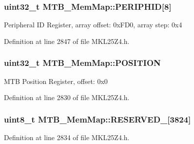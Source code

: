 \subsubsection[{\texorpdfstring{P\+E\+R\+I\+P\+H\+ID}{PERIPHID}}]{\setlength{\rightskip}{0pt plus 5cm}uint32\+\_\+t M\+T\+B\+\_\+\+Mem\+Map\+::\+P\+E\+R\+I\+P\+H\+ID\mbox{[}8\mbox{]}}\hypertarget{struct_m_t_b___mem_map_a1e121406a44ce4c5261292e960a86e29}{}\label{struct_m_t_b___mem_map_a1e121406a44ce4c5261292e960a86e29}
Peripheral ID Register, array offset\+: 0x\+F\+D0, array step\+: 0x4 

Definition at line 2847 of file M\+K\+L25\+Z4.\+h.

\subsubsection[{\texorpdfstring{P\+O\+S\+I\+T\+I\+ON}{POSITION}}]{\setlength{\rightskip}{0pt plus 5cm}uint32\+\_\+t M\+T\+B\+\_\+\+Mem\+Map\+::\+P\+O\+S\+I\+T\+I\+ON}\hypertarget{struct_m_t_b___mem_map_af02973e301b85c6ea0c6ba7520b59173}{}\label{struct_m_t_b___mem_map_af02973e301b85c6ea0c6ba7520b59173}
M\+TB Position Register, offset\+: 0x0 

Definition at line 2830 of file M\+K\+L25\+Z4.\+h.

\subsubsection[{\texorpdfstring{R\+E\+S\+E\+R\+V\+E\+D\+\_\+0}{RESERVED_0}}]{\setlength{\rightskip}{0pt plus 5cm}uint8\+\_\+t M\+T\+B\+\_\+\+Mem\+Map\+::\+R\+E\+S\+E\+R\+V\+E\+D\+\_\mbox{[}3824\mbox{]}}\hypertarget{struct_m_t_b___mem_map_a172ff600859c461e34dc403b3a6dc3ed}{}\label{struct_m_t_b___mem_map_a172ff600859c461e34dc403b3a6dc3ed}


Definition at line 2834 of file M\+K\+L25\+Z4.\+h.

